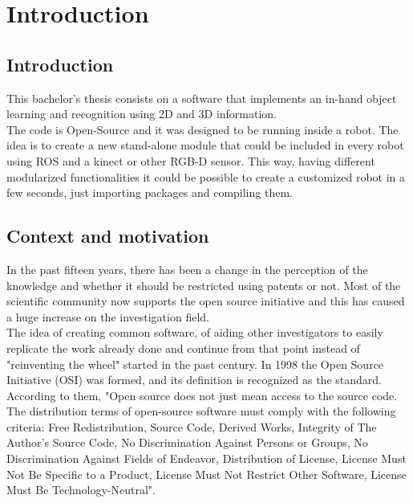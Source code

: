 \part{Introduction}


%	 
%	



\chapter{Introduction}
This bachelor's thesis consists on a software that implements an in-hand object learning and recognition using 2D and 3D information. 
\\

The code is Open-Source and it was designed to be running inside a robot. The idea is to create a new stand-alone module that could be included in every robot using ROS and a kinect or other RGB-D sensor. This way, having different modularized functionalities it could be possible to create a customized robot in a few seconds, just importing packages and compiling them. 
\\[1cm]

\chapter{Context and motivation}
In the past fifteen years, there has been a change in the perception of the knowledge and whether it should be restricted using patents or not. Most of the scientific community now supports the open source initiative and this has caused a huge increase on the investigation field. \\



The idea of creating common software, of aiding other investigators to easily replicate the work already done and continue from that point instead of "reinventing the wheel" started in the past century. In 1998 the Open Source Initiative (OSI)\cite{osi} was formed, and its definition is recognized as the standard. According to them, "Open source does not just mean access to the source code. The distribution terms of open-source software must comply with the following criteria: Free Redistribution, Source Code, Derived Works, Integrity of The Author's Source Code, No Discrimination Against Persons or Groups, No Discrimination Against Fields of Endeavor, Distribution of License, License Must Not Be Specific to a Product, License Must Not Restrict Other Software,  License Must Be Technology-Neutral"\cite{osi_def}. 
\\

